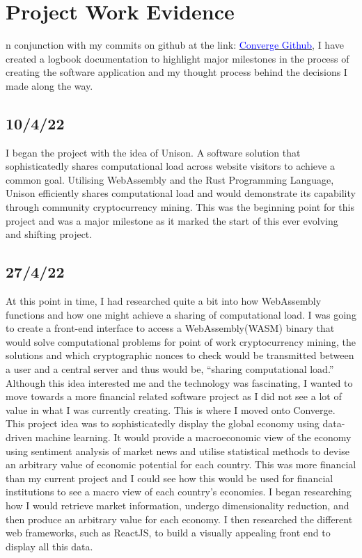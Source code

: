 \let\textcircled=\pgftextcircled
\chapter{Project Work Evidence}
n conjunction with my commits on github at the link: \href{https://github.com/alexjgreig/converge}{\textcolor{blue}{Converge Github}}, I have created a logbook documentation to highlight major milestones in the process of creating the software application and my thought process behind the decisions I made along the way. \\

\section{10/4/22}
I began the project with the idea of Unison. A software solution that sophisticatedly shares computational load across website visitors to achieve a common goal. Utilising WebAssembly and the Rust Programming Language, Unison efficiently shares computational load and would demonstrate its capability through community cryptocurrency mining. This was the beginning point for this project and was a major milestone as it marked the start of this ever evolving and shifting project. \\
\section{27/4/22}
At this point in time, I had researched quite a bit into how WebAssembly functions and how one might achieve a sharing of computational load. I was going to create a front-end interface to access a WebAssembly(WASM) binary that would solve computational problems for point of work cryptocurrency mining, the solutions and which cryptographic nonces to check would be transmitted between a user and a central server and thus would be, “sharing computational load.” Although this idea interested me and the technology was fascinating, I wanted to move towards a more financial related software project as I did not see a lot of value in what I was currently creating. This is where I moved onto Converge. This project idea was to sophisticatedly display the global economy using data-driven machine learning. It would provide a macroeconomic view of the economy using sentiment analysis of market news and utilise statistical methods to devise an arbitrary value of economic potential for each country. This was more financial than my current project and I could see how this would be used for financial institutions to see a macro view of each country’s economies. I began researching how I would retrieve market information, undergo dimensionality reduction, and then produce an arbitrary value for each economy. I then researched the different web frameworks, such as ReactJS, to build a visually appealing front end to display all this data. \\
